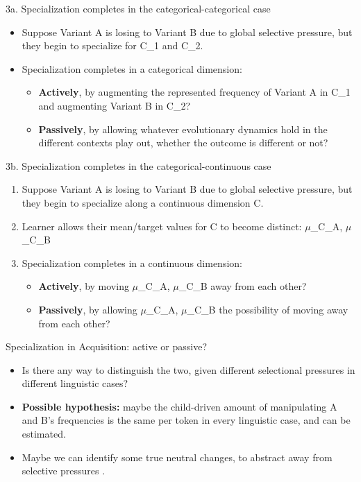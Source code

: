 \documentclass[hyperref={pdfpagelabels=false}]{beamer}
\begin{document}
\begin{frame}{3a. Specialization completes in the categorical-categorical case}
		\begin{itemize}
			\item Suppose Variant A is losing to Variant B due to global selective pressure, but they begin to specialize for C_1 and C_2.
			\item Specialization completes in a categorical dimension:
			\begin{itemize}
				\item \textbf{Actively}, by augmenting the represented frequency of Variant A in C_1 and augmenting Variant B in C_2?
				\item \textbf{Passively}, by allowing whatever evolutionary dynamics hold in the different contexts play out, whether the outcome is different or not?
			\end{itemize}
		\end{itemize}
\end{frame}

\begin{frame}{3b. Specialization completes in the categorical-continuous case}
		\begin{enumerate}
			\item Suppose Variant A is losing to Variant B due to global selective pressure, but they begin to specialize along a continuous dimension C.
			\item Learner allows their mean/target values for C to become distinct: $\mu$_{C_A},  $\mu$_{C_B}
			\item Specialization completes in a continuous dimension:
			\begin{itemize}
				\item \textbf{Actively}, by moving $\mu$_{C_A},  $\mu$_{C_B} away from each other?
				\item \textbf{Passively}, by allowing $\mu$_{C_A},  $\mu$_{C_B} the possibility of moving away from each other?
			\end{itemize}
		\end{enumerate}
\end{frame}


\begin{frame}{Specialization in Acquisition: active or passive?}
		\begin{itemize}
			\item Is there any way to distinguish the two, given different selectional pressures in different linguistic cases?
			\item \textbf{Possible hypothesis:} maybe the child-driven amount of manipulating A and B's frequencies is the same per token in every linguistic case, and can be estimated.
			\item Maybe we can identify some true neutral changes, to abstract away from selective pressures \citep{kauhanen2016}.
		\end{itemize}
\end{frame}
\end{document}
